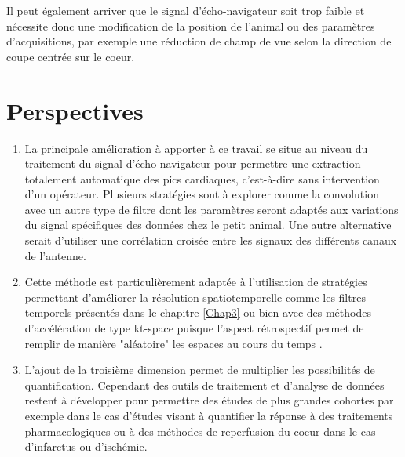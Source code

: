  Il peut également arriver que le signal d'écho-navigateur soit trop faible et nécessite donc une modification de la position de l'animal ou des paramètres d'acquisitions, par exemple une réduction de champ de vue selon la direction de coupe centrée sur le coeur.

\section{Perspectives}
\begin{enumerate}

\item La principale amélioration à apporter à ce travail se situe au niveau du traitement du signal d'écho-navigateur pour permettre une extraction totalement automatique des pics cardiaques, c'est-à-dire sans intervention d'un opérateur. Plusieurs stratégies sont à explorer comme la convolution avec un autre type de filtre dont les paramètres seront adaptés aux variations du signal spécifiques des données chez le petit animal. Une autre alternative serait d'utiliser une corrélation croisée entre les signaux des différents canaux de l'antenne.

\item Cette méthode est particulièrement adaptée à l'utilisation de stratégies permettant d'améliorer la résolution spatiotemporelle comme les filtres temporels présentés dans le chapitre \ref{Chap3} ou bien avec des méthodes d'accélération de type kt-space puisque l'aspect rétrospectif permet de remplir de manière "aléatoire" les espaces au cours du temps \cite{Motaal:2015aa}.

\item L'ajout de la troisième dimension permet de multiplier les possibilités de quantification. Cependant des outils de traitement et d'analyse de données restent à développer pour permettre des études de plus grandes cohortes par exemple dans le cas d'études visant à quantifier la réponse à des traitements pharmacologiques ou à des méthodes de reperfusion du coeur dans le cas d'infarctus ou d'ischémie.
\end{enumerate}



